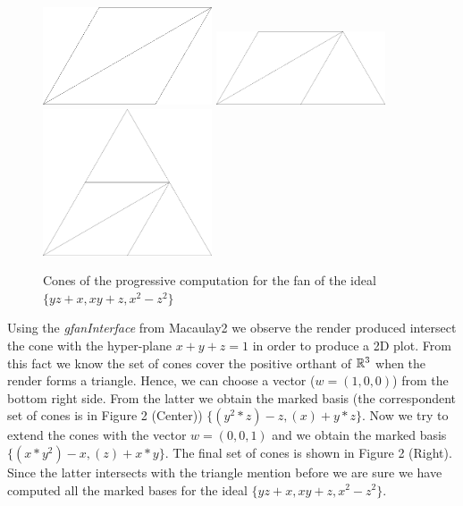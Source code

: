 \begin{example}
  \begin{figure}[h]
    \centering
    \includegraphics[width=5cm]{workingExample1}
    \includegraphics[width=5cm]{workingExample2}
    \includegraphics[width=5cm]{ideal2}
    \caption{Cones of the progressive computation for the \grob fan of the ideal
      $\{yz + x, xy + z, x^2 -z^2\}$}
  \end{figure}

  Using the \emph{gfanInterface} \cite{gfan} from Macaulay2 \cite{M2} we observe the render produced
  intersect the cone with the hyper-plane $x + y + z = 1$ in order to produce a 2D plot. From this
  fact we know the set of cones cover the positive orthant of $\mathbb{R}^3$ when the render forms a triangle.
  Hence, we can choose a vector ($w = (1, 0, 0)$) from the bottom right side. From the latter
  we obtain the marked \grob basis (the correspondent set of cones is in Figure 2 (Center)) $\{(y^2*z) -z, (x) + y*z\}$.
  Now we try to extend the cones with the vector $w = (0, 0, 1)$ and we obtain the marked \grob
  basis $\{(x*y^2) -x, (z) + x*y\}$. The final set of cones is shown in Figure 2 (Right). Since
  the latter intersects with the triangle mention before we are sure we have computed all the
  marked \grob bases for the ideal $\{yz + x, xy + z, x^2 -z^2\}$.
\end{example}



